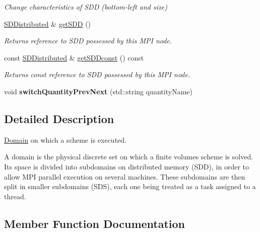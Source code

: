 \begin{DoxyCompactItemize}
\begin{DoxyCompactList}\small\item\em Change characteristics of S\+DD (bottom-\/left and size) \end{DoxyCompactList}\item 
\mbox{\hyperlink{classSDDistributed}{S\+D\+Distributed}} \& \mbox{\hyperlink{classDomain_a26ceb37145bc70b3cc85e15e24a54287}{get\+S\+DD}} ()
\begin{DoxyCompactList}\small\item\em Returns reference to S\+DD possessed by this M\+PI node. \end{DoxyCompactList}\item 
const \mbox{\hyperlink{classSDDistributed}{S\+D\+Distributed}} \& \mbox{\hyperlink{classDomain_a8172470afa3d3ec4c7202c8ee25ab3b8}{get\+S\+D\+Dconst}} () const
\begin{DoxyCompactList}\small\item\em Returns const reference to S\+DD possessed by this M\+PI node. \end{DoxyCompactList}\item 
\mbox{\label{classDomain_a9f12ce216ba0fdb5e46147875f9a97a3}} 
void {\bfseries switch\+Quantity\+Prev\+Next} (std\+::string quantity\+Name)
\end{DoxyCompactItemize}


\subsection{Detailed Description}
\mbox{\hyperlink{classDomain}{Domain}} on which a scheme is executed. 

A domain is the physical discrete set on which a finite volumes scheme is solved. Its space is divided into subdomains on distributed memory (S\+DD), in order to allow M\+PI parallel execution on several machines. These subdomains are then split in smaller subdomains (S\+DS), each one being treated as a task assigned to a thread. 

\subsection{Member Function Documentation}
\mbox{\label{classDomain_a5bbb2345cd478cf5b6d8bd830320a506}} 
